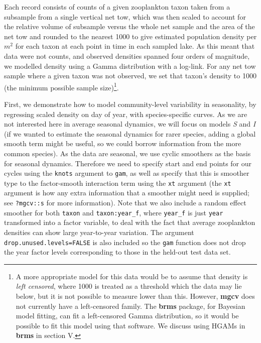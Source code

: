 \documentclass[12pt]{article}
\let\rmarkdownfootnote\footnote%
\def\footnote{\protect\rmarkdownfootnote}
\begin{document}
Each record consists of counts of a given zooplankton taxon taken from a
subsample from a single vertical net tow, which was then scaled to
account for the relative volume of subsample versus the whole net sample
and the area of the net tow and rounded to the nearest 1000 to give
estimated population density per \(m^2\) for each taxon at each point in
time in each sampled lake. As this meant that data were not counts, and
observed densities spanned four orders of magnitude, we modelled density
using a Gamma distribution with a log-link. For any net tow sample where
a given taxon was not observed, we set that taxon's density to 1000 (the
minimum possible sample size)\footnote{A more appropriate model for this
  data would be to assume that density is \emph{left censored}, where
  1000 is treated as a threshold which the data may lie below, but it is
  not possible to measure lower than this. However, \textbf{mgcv} does
  not currently have a left-censored family. The \textbf{brms} package,
  for Bayesian model fitting, can fit a left-censored Gamma
  distribution, so it would be possible to fit this model using that
  software. We discuss using HGAMs in \textbf{brms} in section V.}.

First, we demonstrate how to model community-level variability in
seasonality, by regressing scaled density on day of year, with
species-specific curves. As we are not interested here in average
seasonal dynamics, we will focus on models \emph{S} and \emph{I} (if we
wanted to estimate the seasonal dynamics for rarer species, adding a
global smooth term might be useful, so we could borrow information from
the more common species). As the data are seasonal, we use cyclic
smoothers as the basis for seasonal dynamics. Therefore we need to
specify start and end points for our cycles using the \texttt{knots}
argument to \texttt{gam}, as well as specify that this is smoother type
to the factor-smooth interaction term using the \texttt{xt} argument
(the \texttt{xt} argument is how any extra information that a smoother
might need is supplied; see \texttt{?mgcv::s} for more information).
Note that we also include a random effect smoother for both
\texttt{taxon} and \texttt{taxon:year\_f}, where \texttt{year\_f} is
just \texttt{year} transformed into a factor variable, to deal with the
fact that average zooplankton densities can show large year-to-year
variation. The argument \texttt{drop.unused.levels=FALSE} is also
included so the \texttt{gam} function does not drop the year factor
levels corresponding to those in the held-out test data set.
\end{document}
